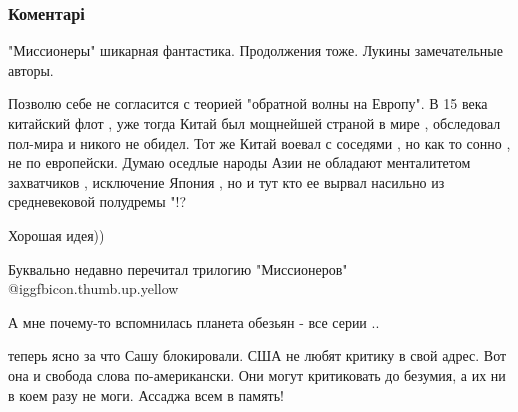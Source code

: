  
 
 
 
 
\subsubsection{Коментарі}
\label{sec:16_11_2021.fb.hakimov_aleksandr.1.realnost_alternativnaja.cmt}

\begin{itemize} %
"Миссионеры" шикарная фантастика. Продолжения тоже. Лукины замечательные авторы.


Позволю себе не согласится с теорией "обратной волны на Европу". В 15 века
китайский флот , уже тогда Китай был мощнейшей страной в мире , обследовал
пол-мира и никого не обидел. Тот же Китай воевал с соседями , но как то сонно ,
не по европейски. Думаю оседлые народы Азии не обладают менталитетом
захватчиков , исключение Япония , но и тут кто ее вырвал насильно из
средневековой полудремы "!?

Хорошая идея))

Буквально недавно перечитал трилогию "Миссионеров" @igg{fbicon.thumb.up.yellow} 

А мне почему-то вспомнилась планета обезьян - все серии ..


теперь ясно за что Сашу блокировали. США не любят критику в свой адрес. Вот она
и свобода слова по-американски. Они могут критиковать до безумия, а их ни в
коем разу не моги. Ассаджа всем в память!

\end{itemize} %

